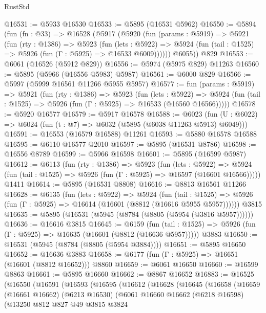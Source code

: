 \begin{lexlean}{RustStd}
\begin{coremodule}
{{@16531 := @5933 @16530
@16533 := @5895 (@16531 @5962)
@16550 := @5894
    (fun (fn : @33) =>
    @16528
      (@5917
        (@5920
          (fun (params : @5919) =>
          @5921
            (fun (rty : @1386) =>
            @5923
              (fun (lets : @5922) =>
              @5924 (fun (tail : @1525) => @5926 (fun (Γ : @5925) => @16533 @6009))))))
        @6055))
    @829
@16553 := @6061 (@16526 (@5912 @829))
@16556 := @5974 (@5975 @829) @11263
@16560 := @5895 (@5966 (@16556 @5983) @5987)
@16561 := @6000 @829
@16566 := @5997 (@5999 @16561 @11266 @5955 @5957)
@16577 := fun (params : @5919) =>
  @5921
    (fun (rty : @1386) =>
    @5923
      (fun (lets : @5922) =>
      @5924 (fun (tail : @1525) => @5926 (fun (Γ : @5925) => @16533 (@16560 @16566)))))
@16578 := @5920 @16577
@16579 := @5917 @16578
@16588 := @6023
    (fun (U : @6022) => @6024 (fun (t : @7) => @6032 (@5895 (@6038 @11263 @5913) @6049)))
@16591 := @16553 (@16579 @16588) @11261
@16593 := @5880 @16578 @16588
@16595 := @6110 @16577 @2010
@16597 := @5895 (@16531 @8786)
@16598 := @16556 @8789
@16599 := @5966 @16598
@16601 := @5895 (@16599 @5987)
@16612 := @6113
    (fun (rty : @1386) =>
    @5923
      (fun (lets : @5922) =>
      @5924 (fun (tail : @1525) => @5926 (fun (Γ : @5925) => @16597 (@16601 @16566)))))
    @1411
@16614 := @5895 (@16531 @8808)
@16616 := @8813 @16561 @11266
@16628 := @6135
    (fun (lets : @5922) =>
    @5924
      (fun (tail : @1525) =>
      @5926 (fun (Γ : @5925) => @16614 (@16601 (@8812 (@16616 @5955 @5957))))))
    @3815
@16635 := @5895 (@16531 (@5945 (@8784 (@8805 (@5954 (@3816 @5957))))))
@16636 := @16616 @3815
@16645 := @6159
    (fun (tail : @1525) => @5926 (fun (Γ : @5925) => @16635 (@16601 (@8812 (@16636 @5957)))))
    @3883
@16650 := @16531 (@5945 (@8784 (@8805 (@5954 @3884))))
@16651 := @5895 @16650
@16652 := @16636 @3883
@16658 := @6177 (fun (Γ : @5925) => @16651 (@16601 (@8812 @16652))) @8860
@16659 := @6061 @16650
@16660 := @16599 @8863
@16661 := @5895 @16660
@16662 := @8867 @16652
@16883 := @16525
    (@16550
      (@16591
        (@16593
          (@16595
            (@16612
              (@16628
                (@16645
                  (@16658
                    (@16659
                      (@16661 @16662)
                      (@6213 @16530)
                      (@6061
                        @16660
                        @16662
                        (@6218 @16598)
                        (@13250
                          @812
                          @827
                          @49
                          @3815
                          @3824
}}
\end{coremodule}
\end{lexlean}
